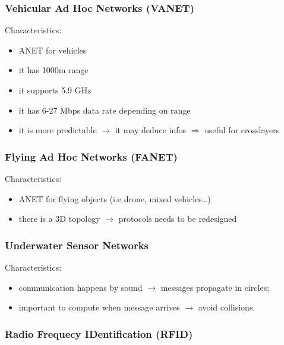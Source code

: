 \subsubsection{Vehicular Ad Hoc Networks (VANET)}

Characteristics:
\begin{itemize}
    \item ANET for vehicles
    \item it has 1000m range
    \item it supports 5.9 GHz
    \item it has 6-27 Mbps data rate depending on range
    \item it is more predictable $\rightarrow$ it may deduce infos
    $\Rightarrow$ useful for crosslayers
\end{itemize}

\subsubsection{Flying Ad Hoc Networks (FANET)}

Characteristics:
\begin{itemize}
    \item ANET for flying objects (i.e drone, mixed vehicles\dots)
    \item there is a 3D topology $\rightarrow$ protocols needs to be redesigned
\end{itemize}

\subsubsection{Underwater Sensor Networks}

Characteristics:
\begin{itemize}
    \item communication happens by sound $\rightarrow$
    messages propagate in circles;
    \item important to compute when message arrives $\rightarrow$ avoid collisions.
\end{itemize}

\subsubsection{Radio Frequecy IDentification (RFID)}

